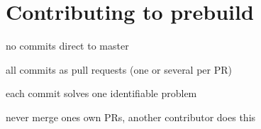 \chapter{Contributing to prebuild}
\hypertarget{md_backend_2node__modules_2prebuild-install_2_c_o_n_t_r_i_b_u_t_i_n_g}{}\label{md_backend_2node__modules_2prebuild-install_2_c_o_n_t_r_i_b_u_t_i_n_g}
\label{md_backend_2node__modules_2prebuild-install_2_c_o_n_t_r_i_b_u_t_i_n_g_autotoc_md2719}%
%

\begin{DoxyItemize}
\item no commits direct to master
\item all commits as pull requests (one or several per PR)
\item each commit solves one identifiable problem
\item never merge one\textquotesingle{}s own PRs, another contributor does this 
\end{DoxyItemize}